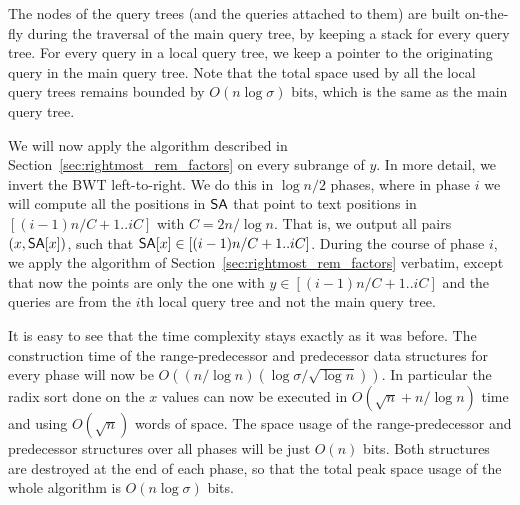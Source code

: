\documentclass[11pt,runningheads]{llncs}
\def\SA{\mbox{\rm {\sf SA}}}
\begin{document}
The nodes of the query trees (and the queries attached to them) 
are built on-the-fly during the traversal 
of the main query tree, by keeping a stack for every query tree. 
For every query in a local query tree, we keep a pointer to the originating 
query in the main query tree.
Note that the total space used by all the local query trees remains bounded 
by $O(n\log\sigma)$ bits, which is the same as the main query tree. 

We will now apply the algorithm described in Section~\ref{sec:rightmost_rem_factors} 
on every subrange of $y$. In more detail, we invert the BWT left-to-right. 
We do this in $\log n/2$ phases, where in phase $i$ we will 
compute all the positions in $\SA$ that point to text positions in 
$[(i-1)n/C+1..iC]$ with $C=2n/\log n$. That is, we output all pairs $(x,\SA[x])$, 
such that $\SA[x] \in [(i-1)n/C+1..iC]$. During the course of phase $i$, we apply 
the algorithm of Section~\ref{sec:rightmost_rem_factors} verbatim, 
except that now the points are only the one with $y\in[(i-1)n/C+1..iC]$ 
and the queries are from the $i$th local query tree and not 
the main query tree. 

It is easy to see that the time complexity stays exactly as it was before. 
The construction time of the range-predecessor and predecessor data structures 
for every phase will now be $O((n/\log n)(\log\sigma/\sqrt{\log n}))$. 
In particular the radix sort done on the $x$ values can now be executed 
in $O(\sqrt{n}+n/\log n)$ time and using $O(\sqrt{n})$ words of space. 
The space usage of the range-predecessor and predecessor structures over all 
phases will be just $O(n)$ bits. Both structures are destroyed at the end of 
each phase, so that the total peak space usage of the whole algorithm is $O(n\log\sigma)$ bits. 
\end{document}
